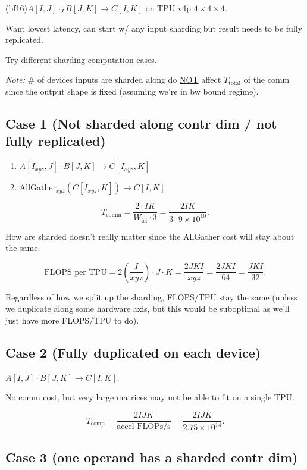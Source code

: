 \documentclass[11pt]{article}
\newcommand{\flopss}{\text{FLOPs/s}}
\newcommand{\Tcomm}{T_{\text{comm}}}
\newcommand{\Tcomp}{T_{\text{comp}}}
\newcommand{\Ttotal}{T_{\text{total}}}
\newcommand{\Wici}{W_{\text{ici}}}
\begin{document}
(bf16)\quad $A[I, J] \cdot_J B[J, K] \to C[I, K]$ on TPU v4p $4 \times 4 \times 4$.

Want lowest latency, can start w/ any input sharding but result needs to be fully replicated.

Try different sharding computation cases.

\emph{Note:} \# of devices inputs are sharded along do \underline{NOT} affect $\Ttotal$ of the comm since the output shape is fixed (assuming we're in bw bound regime).

\subsection*{Case 1 (Not sharded along contr dim / not fully replicated)}

\begin{enumerate}
  \item $A[I_{xyz}, J] \cdot B[J, K] \to C[I_{xyz}, K]$
  \item $\text{AllGather}_{xyz}(C[I_{xyz}, K]) \to C[I, K]$
\end{enumerate}

\[
\Tcomm = \frac{2 \cdot IK}{\Wici \cdot 3} = \frac{2IK}{3 \cdot 9 \times 10^{10}}.
\]

How are sharded doesn't really matter since the AllGather cost will stay about the same.

\[
\text{FLOPS per TPU} = 2\left(\frac{I}{xyz}\right) \cdot J \cdot K = \frac{2JKI}{xyz} = \frac{2JKI}{64} = \frac{JKI}{32}.
\]

Regardless of how we split up the sharding, FLOPS/TPU stay the same (unless we duplicate along some hardware axis, but this would be suboptimal as we'll just have more FLOPS/TPU to do).

\subsection*{Case 2 (Fully duplicated on each device)}

$A[I, J] \cdot B[J, K] \to C[I, K]$.

No comm cost, but very large matrices may not be able to fit on a single TPU.

\[
\Tcomp = \frac{2IJK}{\text{accel }\flopss} = \frac{2IJK}{2.75 \times 10^{14}}.
\]

\subsection*{Case 3 (one operand has a sharded contr dim)}
\end{document}
